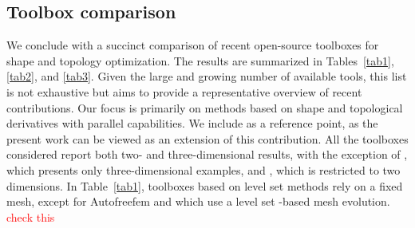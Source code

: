 \documentclass[preprint,9pt]{elsarticle}
\newcommand{\red}{\textcolor{red}}
\begin{document}
\subsection{Toolbox comparison}

We conclude with a succinct comparison of recent open-source toolboxes for shape and topology optimization. The results are summarized in Tables~\ref{tab1}, \ref{tab2}, and \ref{tab3}. Given the large and growing number of available tools, this list is not exhaustive but aims to provide a representative overview of recent contributions.
Our focus is primarily on methods based on shape and topological derivatives with parallel capabilities. We include \cite{MR3843884} as a reference point, as the present work can be viewed as an extension of this contribution.
All the toolboxes considered report both two- and three-dimensional results, with the exception of \cite{MR4916810}, which presents only three-dimensional examples, and \cite{MR3843884}, which is restricted to two dimensions.
In Table~\ref{tab1}, toolboxes based on level set methods rely on a fixed mesh, except for  Autofreefem \cite{Allaire2024} and \cite{LI2021103561}  which use a level set -based mesh evolution. \red{check this}
\end{document}

